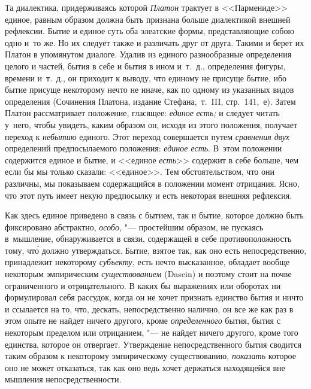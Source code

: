 Та диалектика, придерживаясь которой {\em Платон} трактует в <<Пармениде>>
единое, равным образом должна быть признана больше диалектикой внешней
рефлексии. Бытие и единое суть оба элеатские формы, представляющие собою одно
и~то же. Но их следует также и различать друг от друга. Такими и берет их
Платон в упомянутом диалоге. Удалив из единого разнообразные определения целого
и частей, бытия в себе и бытия в ином и~т.~д., определения фигуры, времени
и~т.~д., он приходит к выводу, что единому не присуще бытие, ибо бытие присуще
некоторому нечто не иначе, как по одному из указанных видов определения
(Сочинения Платона, издание Стефана,~т.~III, стр.~141,~е). Затем Платон
рассматривает положение, гласящее: {\em единое} {\em есть;} и следует читать
у~него, чтобы увидеть, каким образом он, исходя из этого положения, получает
переход к {\em небытию} единого. Этот переход совершается путем {\em сравнения
двух} определений предпосылаемого положения: {\em единое есть}. В~этом
положении содержится единое и бытие, и <<единое {\em есть}>> содержит в себе
больше, чем если бы мы только сказали: <<единое>>. Тем обстоятельством, что они
различны, мы показываем содержащийся в положении момент отрицания. Ясно, что
этот путь имеет некую предпосылку и есть некоторая внешняя рефлексия.

Как здесь единое приведено в связь с бытием, так и бытие, которое должно быть
фиксировано абстрактно, {\em особо,} "--- простейшим образом, не пускаясь
в~мышление, обнаруживается в связи, содержащей в себе противоположность тому,
чт\'{о} должно утверждаться. Бытие, взятое так, как оно есть непосредственно,
принадлежит некоторому {\em субъекту,} есть нечто высказанное, обладает вообще
некоторым эмпирическим {\em существованием} (Dasein) и поэтому стоит на почве
ограниченного и отрицательного. В каких бы выражениях или оборотах ни
формулировал себя рассудок, когда он не хочет признать единство бытия и ничто и
ссылается на то, что, дескать, непосредственно налично, он все же как раз в
этом опыте не найдет ничего другого, кроме {\em определенного} бытия, бытия с
некоторым пределом или отрицанием, "--- не найдет ничего другого, кроме того
единства, которое он отвергает. Утверждение непосредственного бытия сводится
таким образом к некоторому эмпирическому существованию, {\em показать} которое
оно не может отказаться, так как оно ведь хочет держаться находящейся вне
мышления непосредственности.

